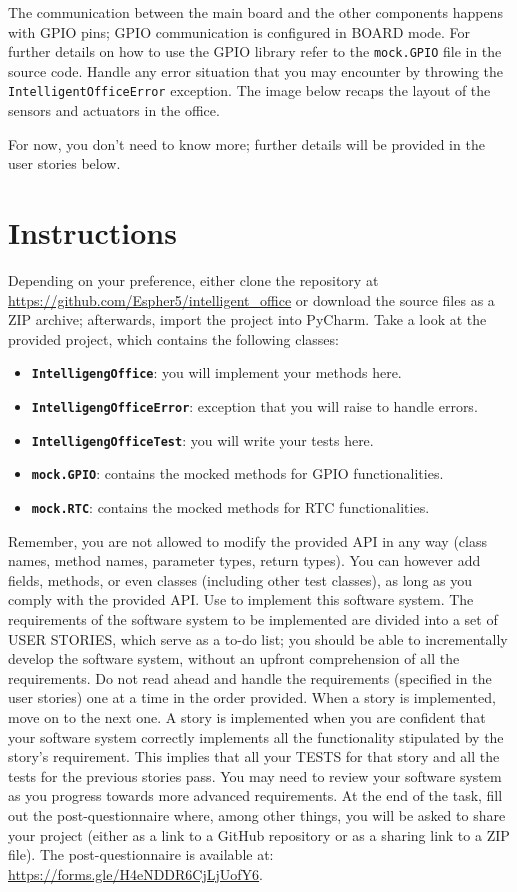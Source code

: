 The communication between the main board and the other components happens with GPIO pins; GPIO communication is configured in BOARD mode. For further details on how to use the GPIO library refer to the \texttt{mock.GPIO} file in the source code.
Handle any error situation that you may encounter by throwing the \texttt{IntelligentOfficeError} exception.
The image below recaps the layout of the sensors and actuators in the office.

For now, you don't need to know more; further details will be provided in the user stories below.

\section{Instructions}
Depending on your preference, either clone the repository at \url{https://github.com/Espher5/intelligent_office} or download the source files as a ZIP archive; afterwards, import the project into PyCharm. 
Take a look at the provided project, which contains the following classes: 
\begin{itemize}
    \item \textbf{\texttt{IntelligengOffice}}: you will implement your methods here.
    \item \textbf{\texttt{IntelligengOfficeError}}: exception that you will raise to handle errors.
    \item \textbf{\texttt{IntelligengOfficeTest}}: you will write your tests here.
    \item \textbf{\texttt{mock.GPIO}}: contains the mocked methods for GPIO functionalities.
    \item \textbf{\texttt{mock.RTC}}: contains the mocked methods for RTC functionalities.
\end{itemize}

Remember, you are not allowed to modify the provided API in any way (\ie class names, method names, parameter types, return types). You can however add fields, methods, or even classes (including other test classes), as long as you comply with the provided API. Use \tdd to implement this software system.
The requirements of the software system to be implemented are divided into a set of USER STORIES, which serve as a to-do list; you should be able to incrementally develop the software system, without an upfront comprehension of all the requirements. Do not read ahead and handle the requirements (\ie specified in the user stories) one at a time in the order provided.
When a story is implemented, move on to the next one. A story is implemented when you are confident that your software system correctly implements all the functionality stipulated by the story's requirement. This implies that all your TESTS for that story and all the tests for the previous stories pass. You may need to review your software system as you progress towards more advanced requirements.
At the end of the task, fill out the post-questionnaire where, among other things, you will be asked to share your project (either as a link to a GitHub repository or as a sharing link to a ZIP file). The post-questionnaire is available at: \url{https://forms.gle/H4eNDDR6CjLjUofY6}.


